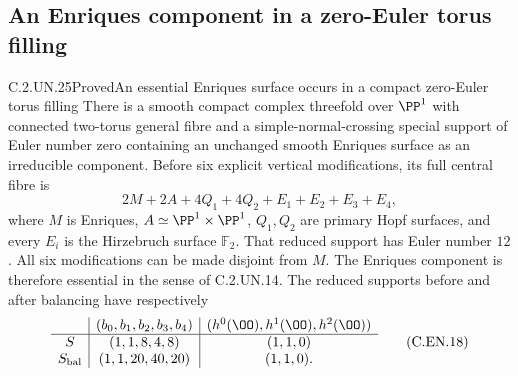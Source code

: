\subsection{An Enriques component in a zero-Euler torus filling}

\begin{statement}{C.2.UN.25}{Proved}{An essential Enriques surface occurs in a compact zero-Euler torus filling}
There is a smooth compact complex threefold over
$\PP^1$ with connected two-torus general fibre and
a simple-normal-crossing special support of Euler
number zero containing an unchanged smooth Enriques
surface as an irreducible component.
Before six explicit vertical modifications, its full
central fibre is
\[
 2M+2A+4Q_1+4Q_2+E_1+E_2+E_3+E_4,                 \tag{C.EN.1}
\]
where $M$ is Enriques, $A\simeq\PP^1\times\PP^1$,
$Q_1,Q_2$ are primary Hopf surfaces, and every
$E_i$ is the Hirzebruch surface $\mathbb F_2$.
That reduced support has Euler number $12$.
All six modifications can be made disjoint from $M$.
The Enriques component is therefore essential in the
sense of C.2.UN.14.
The reduced supports before and after balancing have
respectively
\[
 \begin{array}{c|c|c}
 & (b_0,b_1,b_2,b_3,b_4)&(h^0(\OO),h^1(\OO),h^2(\OO))\\ \hline
 S&(1,1,8,4,8)&(1,1,0)\\
 S_{\rm bal}&(1,1,20,40,20)&(1,1,0).
 \end{array}                                             \tag{C.EN.18}
\]
\end{statement}
